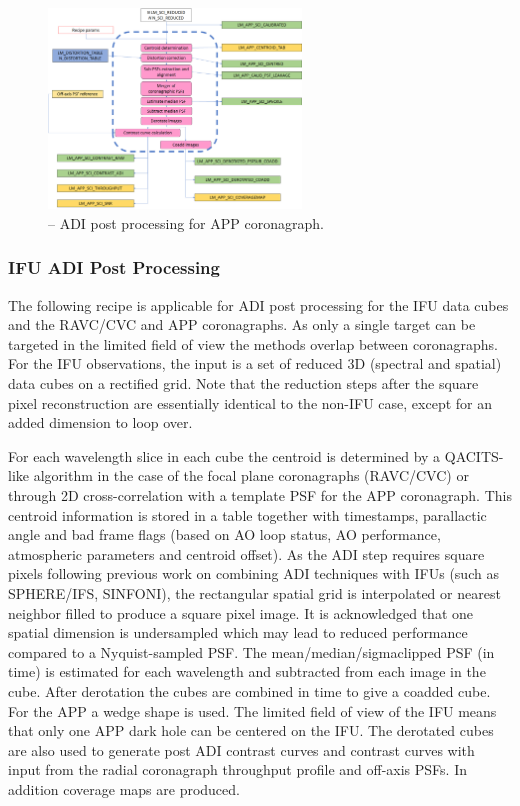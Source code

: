 \begin{figure}[hb]
  \centering
  \includegraphics[width=0.6\textwidth]{./figures/metis_lm_adi_app}
  \caption[Recipe: ]{ -- ADI post processing for APP coronagraph.
    }
  \label{fig:metis_lm_adi_app}
\end{figure}



\subsubsection{IFU ADI Post Processing}
\label{sssec:adi_ifu}


The following recipe is applicable for ADI post processing for the IFU
data cubes and the RAVC/CVC and APP coronagraphs. As only a single
target can be targeted in the limited field of view the methods
overlap between coronagraphs.  For the IFU observations, the input is
a set of reduced 3D (spectral and spatial) data cubes on a rectified
grid. Note that the reduction steps after the square pixel reconstruction
are essentially identical to the non-IFU case, except for an added dimension
to loop over. 

For each wavelength slice in each cube the centroid is determined by a
QACITS-like algorithm in the case of the focal plane coronagraphs
(RAVC/CVC) or through 2D cross-correlation with a template PSF for the
APP coronagraph. This centroid information is stored in a table
together with timestamps, parallactic angle and bad frame flags (based
on AO loop status, AO performance, atmospheric parameters and centroid
offset).  As the ADI step requires square pixels following previous
work on combining ADI techniques with IFUs (such as SPHERE/IFS,
SINFONI), the rectangular spatial grid is interpolated or nearest
neighbor filled to produce a square pixel image.  It is acknowledged
that one spatial dimension is undersampled which may lead to reduced
performance compared to a Nyquist-sampled PSF.  The
mean/median/sigmaclipped PSF (in time) is estimated for each
wavelength and subtracted from each image in the cube.  After
derotation the cubes are combined in time to give a coadded cube. For
the APP a wedge shape is used. The limited field of view of the IFU
means that only one APP dark hole can be centered on the IFU. The derotated cubes
are also used to generate post ADI contrast curves and contrast curves
with input from the radial coronagraph throughput profile and off-axis
PSFs. In addition coverage maps are produced.


